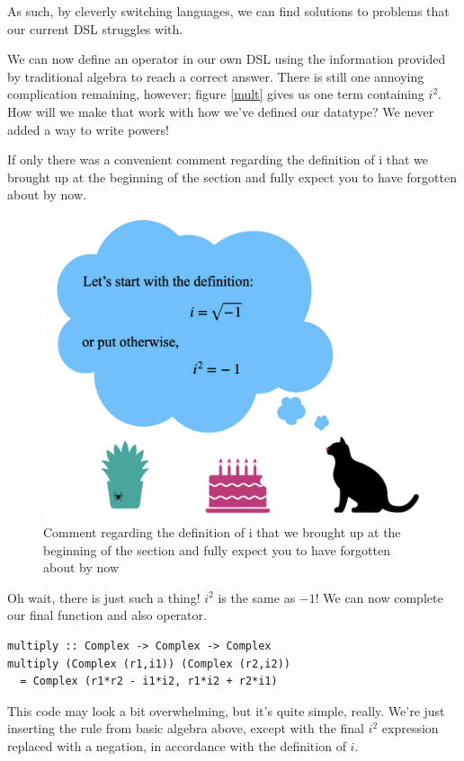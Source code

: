 As such, by cleverly switching languages, we can find solutions to problems that our current DSL struggles with.

We can now define an operator in our own DSL using the information provided by traditional algebra to reach a correct answer. There is still one annoying complication remaining, however; figure \ref{mult} gives us one term containing $i^2$. How will we make that work with how we've defined our datatype? We never added a way to write powers!

If only there was a convenient comment regarding the definition of i that we brought up at the beginning of the section and fully expect you to have forgotten about by now.

\begin{figure}[h!]
    \centering
    \includegraphics[scale= 0.4]{catretrospective.png}
    \caption{Comment regarding the definition of i that we brought up at the beginning of the section and fully expect you to have forgotten about by now}
    \label{catretro}
\end{figure}

Oh wait, there is just such a thing! $i^2$ is the same as $-1$! We can now complete our final function and also operator.

\begin{verbatim}
multiply :: Complex -> Complex -> Complex
multiply (Complex (r1,i1)) (Complex (r2,i2))
  = Complex (r1*r2 - i1*i2, r1*i2 + r2*i1)
\end{verbatim}
This code may look a bit overwhelming, but it's quite simple, really. We're just inserting the rule from basic algebra above, except with the final $i^2$ expression replaced with a negation, in accordance with the definition of $i$.

